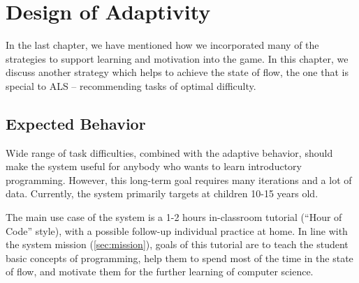 \chapter{Design of Adaptivity}
\label{chap:design-of-adaptivity}

In the last chapter, we have mentioned how we incorporated many of the
strategies to support learning and motivation into the game.
In this chapter, we discuss another strategy which helps to achieve the state of
flow, the one that is special to ALS  %
-- recommending tasks of optimal difficulty.

\section{Expected Behavior}  %
\label{sec:robomission.behavior}



Wide range of task difficulties, combined with the adaptive behavior,
should make the system useful for anybody who wants to learn
introductory programming.
However, this long-term goal requires many iterations and a lot of data.
Currently, the system primarily targets at children 10-15 years old.

The main use case of the system is a 1-2 hours in-classroom tutorial
(``Hour of Code'' style), with a possible follow-up individual practice at home.
In line with the system mission (\cref{sec:mission}), goals of this tutorial
are to teach the student basic concepts of programming,
help them to spend most of the time in the state of flow,
and motivate them for the further learning of computer science.

